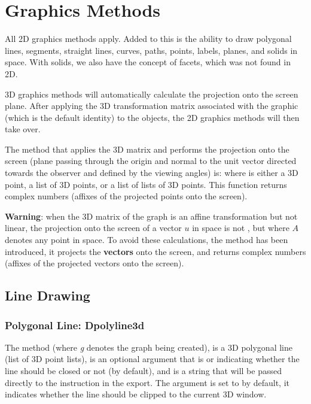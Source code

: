 \section{Graphics Methods}

All 2D graphics methods apply. Added to this is the ability to draw polygonal lines, segments, straight lines, curves, paths, points, labels, planes, and solids in space. With solids, we also have the concept of facets, which was not found in 2D.

3D graphics methods will automatically calculate the projection onto the screen plane. After applying the 3D transformation matrix associated with the graphic (which is the default identity) to the objects, the 2D graphics methods will then take over.

The method that applies the 3D matrix and performs the projection onto the screen (plane passing through the origin and normal to the unit vector directed towards the observer and defined by the viewing angles) is:  where  is either a 3D point, a list of 3D points, or a list of lists of 3D points. This function returns complex numbers (affixes of the projected points onto the screen).

\textbf{Warning}: when the 3D matrix of the graph is an affine transformation but not linear, the projection onto the screen of a vector $u$ in space is not , but  where $A$ denotes any point in space. To avoid these calculations, the method  has been introduced, it projects the \textbf{vectors} onto the screen, and returns complex numbers (affixes of the projected vectors onto the screen).

\subsection{Line Drawing}

\subsubsection{Polygonal Line: Dpolyline3d}

The method  (where \emph{g} denotes the graph being created),  is a 3D polygonal line (list of 3D point lists),  is an optional argument that is \true or \false indicating whether the line should be closed or not (\false by default), and  is a string that will be passed directly to the \drawcmd instruction in the export. The  argument is set to \false by default, it indicates whether the line  should be clipped to the current 3D window.

